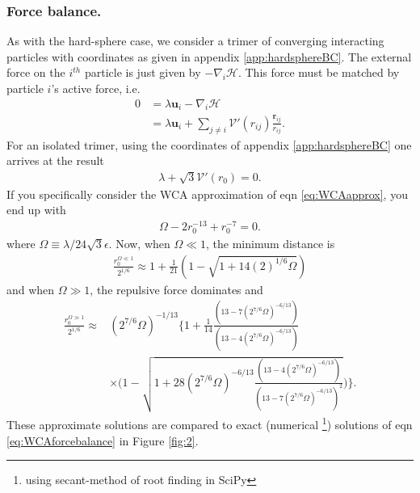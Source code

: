 \documentclass[twocolumn,amsmath,amssymb,aps]{revtex4-1}%
\begin{document}
\subsubsection{Force balance.}
As with the hard-sphere case, we consider a trimer of converging interacting
particles with coordinates as given in appendix \ref{app:hardsphereBC}. The
external force on the $i^{th}$ particle is just given by
$-\nabla_i\mathcal{H}$. This force must be matched by particle $i$'s active
force, i.e.
\begin{align}
  0
  &= \lambda\bm{u}_i-\nabla_i\mathcal{H}\nonumber\\
  &= \lambda\bm{u}_i+\sum_{j\neq i}\mathcal{V}'(r_{ij})
    \frac{\bm{r}_{ij}}{r_{ij}}.
\end{align}
For an isolated trimer, using the coordinates of appendix
\ref{app:hardsphereBC} one arrives at the result
\begin{align}\label{eq:genericsoftsphereforcebalance}
  \lambda+\sqrt{3}\mathcal{V}'(r_0)=0.
\end{align}
If you specifically consider the WCA approximation of eqn \ref{eq:WCAapprox},
you end up with
\begin{align}\label{eq:WCAforcebalance}
  \Omega-2r_0^{-13}+r_0^{-7}=0.
\end{align}
where $\Omega\equiv{\lambda}/{24\sqrt{3}\epsilon}$.
Now, when $\Omega\ll 1$, the minimum distance is
\begin{align}\label{eq:softsphereforcebalancesmalllambda}
  \frac{r_0^{\Omega\ll 1}}{2^{1/6}}
  \approx1+\frac{1}{21}(1-\sqrt{1+14(2)^{1/6}\Omega})
\end{align}
and when $\Omega\gg 1$, the repulsive force dominates and
\begin{align}\label{eq:softsphereforcebalancelargelambda}
  \frac{r_0^{\Omega\gg 1}}{2^{1/6}}\approx
  &(2^{7/6}\Omega)^{-1/13}\bigg\{1
  +\frac{1}{14}
  \frac{(13-7(2^{7/6}\Omega)^{-6/13})}{(13-4(2^{7/6}\Omega)^{-6/13})}
  \nonumber\\
  &\times\bigg(1-\sqrt{1+28(2^{7/6}\Omega)^{-6/13}
    \frac{(13-4(2^{7/6}\Omega)^{-6/13})}
    {(13-7(2^{7/6}\Omega)^{-6/13})^2}}\bigg)\bigg\}.
\end{align}
These approximate solutions are compared to exact (numerical
\footnote{using secant-method of root finding in SciPy})
solutions of eqn \ref{eq:WCAforcebalance} in Figure \ref{fig:2}.
\end{document}
